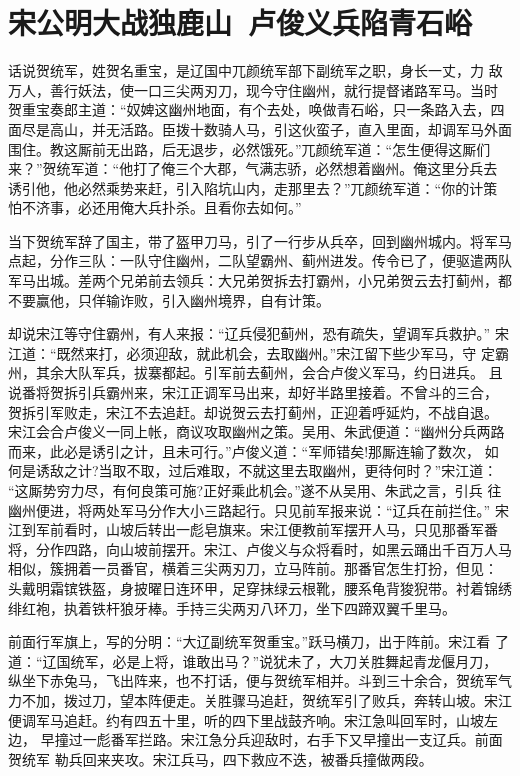\chapter{宋公明大战独鹿山~卢俊义兵陷青石峪}

话说贺统军，姓贺名重宝，是辽国中兀颜统军部下副统军之职，身长一丈，力
敌万人，善行妖法，使一口三尖两刃刀，现今守住幽州，就行提督诸路军马。当时
贺重宝奏郎主道：“奴婢这幽州地面，有个去处，唤做青石峪，只一条路入去，四
面尽是高山，并无活路。臣拨十数骑人马，引这伙蛮子，直入里面，却调军马外面
围住。教这厮前无出路，后无退步，必然饿死。”兀颜统军道：“怎生便得这厮们
来？”贺统军道：“他打了俺三个大郡，气满志骄，必然想着幽州。俺这里分兵去
诱引他，他必然乘势来赶，引入陷坑山内，走那里去？”兀颜统军道：“你的计策
怕不济事，必还用俺大兵扑杀。且看你去如何。”

当下贺统军辞了国主，带了盔甲刀马，引了一行步从兵卒，回到幽州城内。将军马
点起，分作三队：一队守住幽州，二队望霸州、蓟州进发。传令已了，便驱遣两队
军马出城。差两个兄弟前去领兵：大兄弟贺拆去打霸州，小兄弟贺云去打蓟州，都
不要赢他，只佯输诈败，引入幽州境界，自有计策。

却说宋江等守住霸州，有人来报：“辽兵侵犯蓟州，恐有疏失，望调军兵救护。”
宋江道：“既然来打，必须迎敌，就此机会，去取幽州。”宋江留下些少军马，守
定霸州，其余大队军兵，拔寨都起。引军前去蓟州，会合卢俊义军马，约日进兵。
且说番将贺拆引兵霸州来，宋江正调军马出来，却好半路里接着。不曾斗的三合，
贺拆引军败走，宋江不去追赶。却说贺云去打蓟州，正迎着呼延灼，不战自退。
宋江会合卢俊义一同上帐，商议攻取幽州之策。吴用、朱武便道：“幽州分兵两路
而来，此必是诱引之计，且未可行。”卢俊义道：“军师错矣!那厮连输了数次，
如何是诱敌之计?当取不取，过后难取，不就这里去取幽州，更待何时？”宋江道：
“这厮势穷力尽，有何良策可施?正好乘此机会。”遂不从吴用、朱武之言，引兵
往幽州便进，将两处军马分作大小三路起行。只见前军报来说：“辽兵在前拦住。”
宋江到军前看时，山坡后转出一彪皂旗来。宋江便教前军摆开人马，只见那番军番
将，分作四路，向山坡前摆开。宋江、卢俊义与众将看时，如黑云踊出千百万人马
相似，簇拥着一员番官，横着三尖两刃刀，立马阵前。那番官怎生打扮，但见：
头戴明霜镔铁盔，身披曜日连环甲，足穿抹绿云根靴，腰系龟背狻猊带。衬着锦绣
绯红袍，执着铁杆狼牙棒。手持三尖两刃八环刀，坐下四蹄双翼千里马。

前面行军旗上，写的分明：“大辽副统军贺重宝。”跃马横刀，出于阵前。宋江看
了道：“辽国统军，必是上将，谁敢出马？”说犹未了，大刀关胜舞起青龙偃月刀，
纵坐下赤兔马，飞出阵来，也不打话，便与贺统军相并。斗到三十余合，贺统军气
力不加，拨过刀，望本阵便走。关胜骤马追赶，贺统军引了败兵，奔转山坡。宋江
便调军马追赶。约有四五十里，听的四下里战鼓齐响。宋江急叫回军时，山坡左边，
早撞过一彪番军拦路。宋江急分兵迎敌时，右手下又早撞出一支辽兵。前面贺统军
勒兵回来夹攻。宋江兵马，四下救应不迭，被番兵撞做两段。

